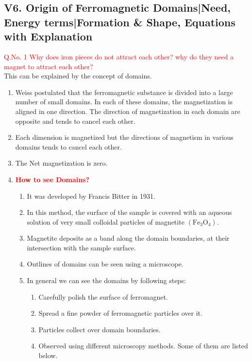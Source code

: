 \subsection*{V6. Origin of Ferromagnetic Domains|Need, Energy terms|Formation \& Shape, Equations with Explanation}

\textcolor{red}{Q.No. 1 Why does iron pieces do not attract each other? why do they need a magnet to attract each other?}\\
 This can be explained by the concept of domains.
\begin{enumerate}
    \item Weiss postulated that the ferromagnetic substance is divided into a large number of small domains. In each of these domains, the magnetization is aligned in one direction. The direction of magnetization in each domain are opposite and tends to cancel each other.
    \item Each dimension is magnetized but the directions of magnetism in various domains tends to cancel each other.
    \item The Net magnetization is zero.
    \item \textcolor{red}{\textbf{How to see Domains?}}
    \begin{enumerate}
        \item It was developed by Francis Bitter in 1931.
        \item In this method, the surface of the sample is covered with an aqueous solution of very small colloidal particles of magnetite $\mathrm{(Fe_3O_4)}$.
        \item Magnetite deposits as a band along the domain boundaries, at their intersection with the sample surface.
        \item Outlines of domains can be seen using a microscope.
        \item In general we can see the domains by following steps:
        \begin{enumerate}
            \item Carefully polish the surface of ferromagnet.
            \item Spread a fine powder of ferromagnetic particles over it.
            \item Particles collect over domain boundaries.
            \item Observed using different microscopy methods. Some of them are listed below.

\end{enumerate}
\end{enumerate}
\end{enumerate}
